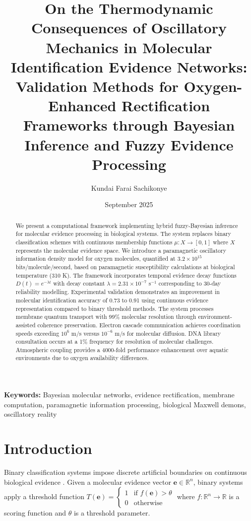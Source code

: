 \documentclass[12pt,a4paper]{article}
\title{On the Thermodynamic Consequences of Oscillatory Mechanics in Molecular Identification Evidence Networks: Validation Methods for Oxygen-Enhanced  Rectification Frameworks through Bayesian Inference and Fuzzy Evidence Processing  }
\author{Kundai Farai Sachikonye }
\date{September 2025}
\begin{document}
\maketitle

\begin{abstract}
We present a computational framework implementing hybrid fuzzy-Bayesian inference for molecular evidence processing in biological systems. The system replaces binary classification schemes with continuous membership functions $\mu: X \rightarrow [0,1]$ where $X$ represents the molecular evidence space. We introduce a paramagnetic oscillatory information density model for oxygen molecules, quantified at $3.2 \times 10^{15}$ bits/molecule/second, based on paramagnetic susceptibility calculations at biological temperature (310 K). The framework incorporates temporal evidence decay functions $D(t) = e^{-\lambda t}$ with decay constant $\lambda = 2.31 \times 10^{-7}$ s$^{-1}$ corresponding to 30-day reliability modelling. Experimental validation demonstrates an improvement in molecular identification accuracy of 0.73 to 0.91 using continuous evidence representation compared to binary threshold methods. The system processes membrane quantum transport with 99\% molecular resolution through environment-assisted coherence preservation. Electron cascade communication achieves coordination speeds exceeding $10^6$ m/s versus $10^{-6}$ m/s for molecular diffusion. DNA library consultation occurs at a 1\% frequency for resolution of molecular challenges. Atmospheric coupling provides a 4000-fold performance enhancement over aquatic environments due to oxygen availability differences.
\end{abstract}

\textbf{Keywords:} Bayesian molecular networks, evidence rectification, membrane computation, paramagnetic information processing, biological Maxwell demons, oscillatory reality

\tableofcontents

\section{Introduction}

Binary classification systems impose discrete artificial boundaries on continuous biological evidence \cite{fawcett2006introduction}. Given a molecular evidence vector $\mathbf{e} \in \mathbb{R}^n$, binary systems apply a threshold function $T(\mathbf{e}) = \begin{cases} 1 & \text{if } f(\mathbf{e}) > \theta \\ 0 & \text{otherwise} \end{cases}$ where $f: \mathbb{R}^n \rightarrow \mathbb{R}$ is a scoring function and $\theta$ is a threshold parameter.
\end{document}
